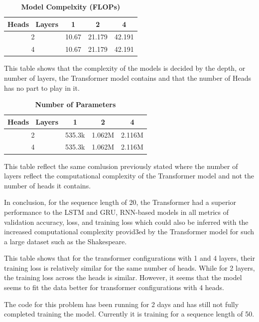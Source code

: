 \documentclass[a4paper]{article}
\begin{document}
\begin{table}[H]
    \centering
    \caption{\textbf{Model Compelxity (FLOPs)}}
    \label{tab:FLOPsSeq20p2}
    \begin{tabular}{| c || c | c | c |}
        \hline
        Heads \ Layers & 1 & 2 & 4 \\
        \hline
        2 & 10.67 & 21.179 & 42.191 \\
        \hline
        4 & 10.67 & 21.179 & 42.191 \\
        \hline
    \end{tabular}
\end{table}

This table shows that the complexity of the models is decided by the depth, or number of layers, the Transformer model contains and that the number of Heads has no part to play in it.

\begin{table}[H]
    \centering
    \caption{\textbf{Number of Parameters}}
    \label{tab:ParamsSeq20p2}
    \begin{tabular}{| c || c | c | c |}
        \hline
        Heads \ Layers & 1 & 2 & 4 \\
        \hline
        2 & 535.3k & 1.062M & 2.116M \\
        \hline
        4 & 535.3k & 1.062M & 2.116M \\
        \hline
    \end{tabular}
\end{table}

This table reflect the same comlusion previously stated where the number of layers reflect the computational complexity of the Transformer model and not the number of heads it contains.

In conclusion, for the sequence length of 20, the Transformer had a superior performance to the LSTM and GRU, RNN-based models in all metrics of validation accuracy, loss, and training loss which could also be inferred with the increased computational complexity provid3ed by the Transformer model for such a large dataset such as the Shakespeare.

This table shows that for the transformer configurations with 1 and 4 layers, their training loss is relatively similar for the same number of heads. While for 2 layers, the training loss across the heads is similar. However, it seems that the model seems to fit the data better for transformer configurations with 4 heads.



The code for this problem has been running for 2 days and has still not fully completed training the model. Currently it is training for a sequence length of 50.
\end{document}
